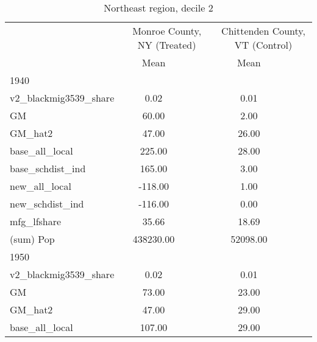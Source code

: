 \begin{table}[htbp]\centering
\def\sym#1{\ifmmode^{#1}\else\(^{#1}\)\fi}
\caption{Northeast region, decile 2 \label{tab1}}
\begin{tabular}{l*{2}{ccc}}
\toprule
                    &\multicolumn{3}{c}{Monroe County, NY (Treated)}&\multicolumn{3}{c}{Chittenden County, VT (Control)}\\
                    &        Mean&            &            &        Mean&            &            \\
\midrule
1940                &            &            &            &            &            &            \\
v2\_blackmig3539\_share&        0.02&            &            &        0.01&            &            \\
GM                  &       60.00&            &            &        2.00&            &            \\
GM\_hat2             &       47.00&            &            &       26.00&            &            \\
base\_all\_local      &      225.00&            &            &       28.00&            &            \\
base\_schdist\_ind    &      165.00&            &            &        3.00&            &            \\
new\_all\_local       &     -118.00&            &            &        1.00&            &            \\
new\_schdist\_ind     &     -116.00&            &            &        0.00&            &            \\
mfg\_lfshare         &       35.66&            &            &       18.69&            &            \\
(sum) Pop           &   438230.00&            &            &    52098.00&            &            \\
\midrule
1950                &            &            &            &            &            &            \\
v2\_blackmig3539\_share&        0.02&            &            &        0.01&            &            \\
GM                  &       73.00&            &            &       23.00&            &            \\
GM\_hat2             &       47.00&            &            &       29.00&            &            \\
base\_all\_local      &      107.00&            &            &       29.00&            &            \\

\end{tabular}
\end{table}
